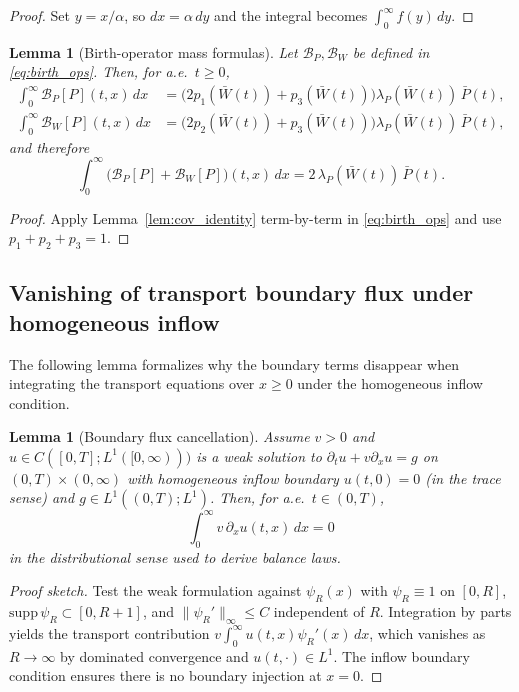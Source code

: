 \documentclass[pdflatex,sn-mathphys-ay]{sn-jnl}
\theoremstyle{thmstyleone}
\newtheorem{lemma}[theorem]{Lemma}
\theoremstyle{definition}
\theoremstyle{remark}
\begin{document}
\begin{appendices}
\begin{proof}
Set $y=x/\alpha$, so $dx=\alpha\,dy$ and the integral becomes
$\int_0^\infty f(y)\,dy$.
\end{proof}

\begin{lemma}[Birth-operator mass formulas]\label{lem:birth_mass}
Let $\mathcal B_P,\mathcal B_W$ be defined in \eqref{eq:birth_ops}. Then, for a.e.\ $t\ge 0$,
\begin{align}
\label{app:eq:BP_mass}
\int_0^\infty \mathcal B_P[P](t,x)\,dx
&=\big(2p_1(\bar W(t))+p_3(\bar W(t))\big)\lambda_P(\bar W(t))\,\bar P(t),\\
\label{app:eq:BW_mass}
\int_0^\infty \mathcal B_W[P](t,x)\,dx
&=\big(2p_2(\bar W(t))+p_3(\bar W(t))\big)\lambda_P(\bar W(t))\,\bar P(t),
\end{align}
and therefore
\begin{equation}\label{app:eq:BPBW_sum}
\int_0^\infty \big(\mathcal B_P[P]+\mathcal B_W[P]\big)(t,x)\,dx
=2\,\lambda_P(\bar W(t))\,\bar P(t).
\end{equation}
\end{lemma}

\begin{proof}
Apply Lemma~\ref{lem:cov_identity} term-by-term in \eqref{eq:birth_ops} and use
$p_1+p_2+p_3=1$.
\end{proof}

\subsection{Vanishing of transport boundary flux under homogeneous inflow}
\label{app:boundary_flux}
The following lemma formalizes why the boundary terms disappear when integrating the transport
equations over $x\ge 0$ under the homogeneous inflow condition.

\begin{lemma}[Boundary flux cancellation]\label{lem:boundary_flux}
Assume $v>0$ and $u\in C([0,T];L^1([0,\infty)))$ is a weak solution to
$\partial_t u+v\partial_x u=g$ on $(0,T)\times(0,\infty)$ with homogeneous inflow boundary
$u(t,0)=0$ (in the trace sense) and $g\in L^1((0,T);L^1)$.
Then, for a.e.\ $t\in(0,T)$,
\begin{equation}\label{app:eq:flux_zero}
\int_0^\infty v\,\partial_x u(t,x)\,dx=0
\end{equation}
in the distributional sense used to derive balance laws.
\end{lemma}

\begin{proof}[Proof sketch]
Test the weak formulation against $\psi_R(x)$ with $\psi_R\equiv 1$ on $[0,R]$,
$\mathrm{supp}\,\psi_R\subset[0,R+1]$, and $\|\psi_R'\|_\infty\le C$ independent of $R$.
Integration by parts yields the transport contribution
$v\int_0^\infty u(t,x)\psi_R'(x)\,dx$, which vanishes as $R\to\infty$ by dominated convergence and
$u(t,\cdot)\in L^1$. The inflow boundary condition ensures there is no boundary injection at $x=0$.
\end{proof}


\end{appendices}
\end{document}
